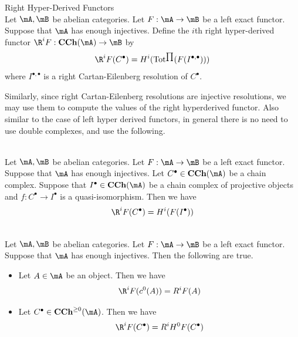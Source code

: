 \documentclass[a4paper]{article}
\begin{document}
\begin{defn}{Right Hyper-Derived Functors}{}\\
Let $\mA,\mB$ be abelian categories. Let $F:\mA\to\mB$ be a left exact functor. Suppose that $\mA$ has enough injectives. Define the $i$th right hyper-derived functor $\R^iF:\bold{CCh}(\mA)\to\mB$ by $$\R^iF(C^\bullet)=H^i(\text{Tot}^{\prod}(F(I^{\bullet,\bullet})))$$ where $I^{\bullet,\bullet}$ is a right Cartan-Eilenberg resolution of $C^\bullet$. 
\end{defn}

Similarly, since right Cartan-Eilenberg resolutions are injective resolutions, we may use them to compute the values of the right hyperderived functor. Also similar to the case of left hyper derived functors, in general there is no need to use double complexes, and use the following. 

\begin{prp}{}{}\\
Let $\mA,\mB$ be abelian categories. Let $F:\mA\to\mB$ be a left exact functor. Suppose that $\mA$ has enough injectives. Let $C^\bullet\in\bold{CCh}(\mA)$ be a chain complex. Suppose that $I^\bullet\in\bold{CCh}(\mA)$ be a chain complex of projective objects and $f:C^\bullet\to I^\bullet$ is a quasi-isomorphism. Then we have $$\R^iF(C^\bullet)=H^i(F(I^\bullet))$$
\end{prp}

\begin{prp}{}{}\\
Let $\mA,\mB$ be abelian categories. Let $F:\mA\to\mB$ be a left exact functor. Suppose that $\mA$ has enough injectives. Then the following are true. 
\begin{itemize}
\item Let $A\in\mA$ be an object. Then we have $$\R^iF(c^0(A))=R^iF(A)$$
\item Let $C^\bullet\in\bold{CCh}^{\geq 0}(\mA)$. Then we have $$\R^iF(C^\bullet)=R^iH^0F(C^\bullet)$$
\end{itemize}
\end{prp}
\end{document}
